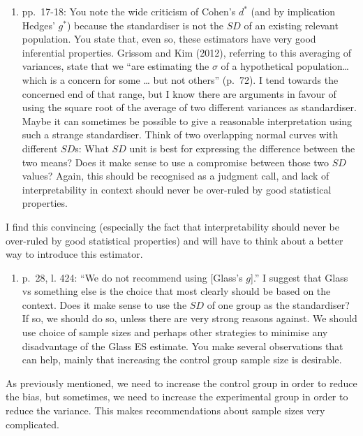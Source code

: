 \documentclass[
  12pt,
  french,
]{article}
\providecommand{\tightlist}{%
  \setlength{\itemsep}{0pt}\setlength{\parskip}{0pt}}
\begin{document}
\begin{enumerate}
\def\labelenumi{\arabic{enumi}.}
\setcounter{enumi}{1}
\tightlist
\item
  pp.~17-18: You note the wide criticism of Cohen's \(d^*\) (and by
  implication Hedges' \(g^*\)) because the standardiser is not the
  \(SD\) of an existing relevant population. You state that, even so,
  these estimators have very good inferential properties. Grissom and
  Kim (2012), referring to this averaging of variances, state that we
  ``are estimating the \(\sigma\) of a hypothetical population\ldots{}
  which is a concern for some \ldots{} but not others'' (p.~72). I tend
  towards the concerned end of that range, but I know there are
  arguments in favour of using the square root of the average of two
  different variances as standardiser. Maybe it can sometimes be
  possible to give a reasonable interpretation using such a strange
  standardiser. Think of two overlapping normal curves with different
  \(SD\)s: What \(SD\) unit is best for expressing the difference
  between the two means? Does it make sense to use a compromise between
  those two \(SD\) values? Again, this should be recognised as a
  judgment call, and lack of interpretability in context should never be
  over-ruled by good statistical properties.
\end{enumerate}

\color{blue} I find this convincing (especially the fact that
interpretability should never be over-ruled by good statistical
properties) and will have to think about a better way to introduce this
estimator.

\color{black}

\begin{enumerate}
\def\labelenumi{\arabic{enumi}.}
\tightlist
\item
  p.~28, l. 424: ``We do not recommend using {[}Glass's \(g\){]}.'' I
  suggest that Glass vs something else is the choice that most clearly
  should be based on the context. Does it make sense to use the \(SD\)
  of one group as the standardiser? If so, we should do so, unless there
  are very strong reasons against. We should use choice of sample sizes
  and perhaps other strategies to minimise any disadvantage of the Glass
  ES estimate. You make several observations that can help, mainly that
  increasing the control group sample size is desirable.
\end{enumerate}

\color{blue} As previously mentioned, we need to increase the control
group in order to reduce the bias, but sometimes, we need to increase
the experimental group in order to reduce the variance. This makes
recommendations about sample sizes very complicated.
\end{document}

